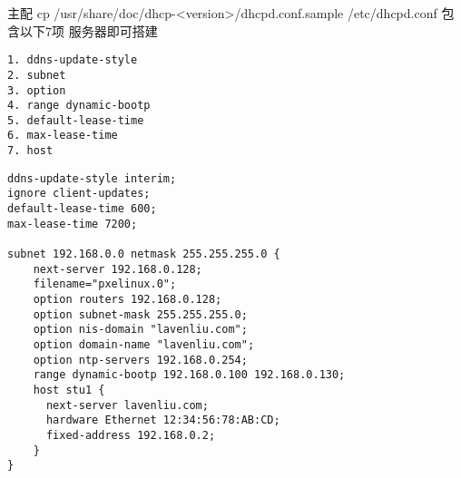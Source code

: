 主配 cp /usr/share/doc/dhcp-<version>/dhcpd.conf.sample /etc/dhcpd.conf
包含以下7项 服务器即可搭建

\small{
\begin{verbatim}
1. ddns-update-style
2. subnet
3. option
4. range dynamic-bootp
5. default-lease-time
6. max-lease-time
7. host
\end{verbatim}
}
\normalsize

\small{
\begin{verbatim}
ddns-update-style interim;
ignore client-updates;
default-lease-time 600;
max-lease-time 7200;

subnet 192.168.0.0 netmask 255.255.255.0 {
    next-server 192.168.0.128;
    filename="pxelinux.0";
    option routers 192.168.0.128;
    option subnet-mask 255.255.255.0;
    option nis-domain "lavenliu.com";
    option domain-name "lavenliu.com";
    option ntp-servers 192.168.0.254;
    range dynamic-bootp 192.168.0.100 192.168.0.130;
    host stu1 {
      next-server lavenliu.com;
      hardware Ethernet 12:34:56:78:AB:CD;
      fixed-address 192.168.0.2;
    }
}
\end{verbatim}
}
\normalsize

